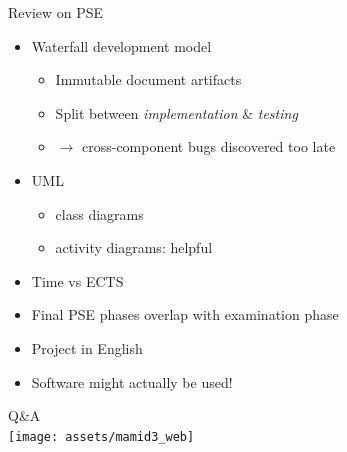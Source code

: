 \documentclass[11pt,aspectratio=169]{beamer}
\newcommand{\xmark}{\ding{55}}%
\newcommand{\checkcomment}[1]{%
    \def\temp{#1}%
    \ifx\temp\empty%
    \emph{}%
    \else%
    \emph{Note: #1}%
    \fi%
}%
\newcommand{\done}[1][]{{\color{darkgreen}\checkmark\checkcomment{#1}}}
\newcommand{\notdone}[1][]{{\color{red}\xmark\checkcomment{#1}}}
\begin{document}
    \newcommand\itembad{\item[\notdone]}
    \newcommand\itemgood{\item[\done]}

    \begin{frame}{Review on PSE}
      \pause
      \begin{itemize}
        \itembad<+-> Waterfall development model
        \begin{itemize}
          \itembad<+-> Immutable document artifacts
          \itembad<+-> Split between \textit{implementation} \& \textit{testing}
          \itembad<+-> $\rightarrow$ cross-component bugs discovered too late
        \end{itemize}
        \itembad<+-> UML
            \begin{itemize}
              \item class diagrams
              \item activity diagrams: helpful
            \end{itemize}
        \itembad<+-> Time vs ECTS
        \itembad<+-> Final PSE phases overlap with examination phase
        \itemgood<+-> Project in English
        \itemgood<+-> Software might actually be used!
      \end{itemize}
    \end{frame}

    \begin{frame}{}
       \vfill
        \centering
        \Huge
        Q\&A \\
            \vspace{10pt}
            \hspace*{5pt}\texttt{[image: assets/mamid3\_web]}
        \vfill
    \end{frame}
    
\end{document}
